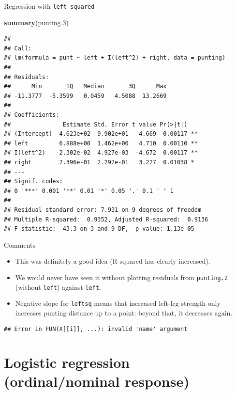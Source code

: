 \documentclass[ignorenonframetext,]{beamer}
\newenvironment{Shaded}{\begin{snugshade}}{\end{snugshade}}
\newcommand{\FloatTok}[1]{\textcolor[rgb]{0.00,0.00,0.81}{#1}}
\newcommand{\KeywordTok}[1]{\textcolor[rgb]{0.13,0.29,0.53}{\textbf{#1}}}
\newcommand{\NormalTok}[1]{#1}
\begin{document}
\begin{frame}[fragile]{Regression with \texttt{left-squared}}
\protect\hypertarget{regression-with-left-squared}{}

\begin{Shaded}
\begin{Highlighting}[]
\KeywordTok{summary}\NormalTok{(punting}\FloatTok{.3}\NormalTok{)}
\end{Highlighting}
\end{Shaded}

\begin{verbatim}
## 
## Call:
## lm(formula = punt ~ left + I(left^2) + right, data = punting)
## 
## Residuals:
##      Min       1Q   Median       3Q      Max 
## -11.3777  -5.3599   0.0459   4.5088  13.2669 
## 
## Coefficients:
##               Estimate Std. Error t value Pr(>|t|)   
## (Intercept) -4.623e+02  9.902e+01  -4.669  0.00117 **
## left         6.888e+00  1.462e+00   4.710  0.00110 **
## I(left^2)   -2.302e-02  4.927e-03  -4.672  0.00117 **
## right        7.396e-01  2.292e-01   3.227  0.01038 * 
## ---
## Signif. codes:  
## 0 '***' 0.001 '**' 0.01 '*' 0.05 '.' 0.1 ' ' 1
## 
## Residual standard error: 7.931 on 9 degrees of freedom
## Multiple R-squared:  0.9352, Adjusted R-squared:  0.9136 
## F-statistic:  43.3 on 3 and 9 DF,  p-value: 1.13e-05
\end{verbatim}

\end{frame}

\begin{frame}[fragile]{Comments}
\protect\hypertarget{comments-9}{}

\begin{itemize}
\item
  This was definitely a good idea (R-squared has clearly increased).
\item
  We would never have seen it without plotting residuals from
  \texttt{punting.2} (without \texttt{left}) against \texttt{left}.
\item
  Negative slope for \texttt{leftsq} means that increased left-leg
  strength only increases punting distance up to a point: beyond that,
  it decreases again.
\end{itemize}

\begin{verbatim}
## Error in FUN(X[[i]], ...): invalid 'name' argument
\end{verbatim}

\section{Logistic regression (ordinal/nominal response)}
\frame{\sectionpage}

\end{frame}
\end{document}
